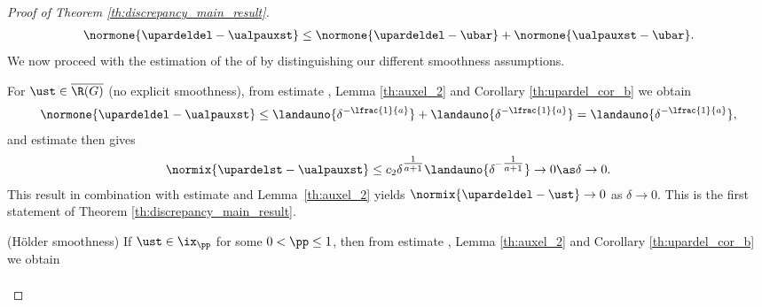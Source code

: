 \documentclass[10pt]{article}
\theoremstyle{definition}
\begin{document}
\begin{proof}[Proof of Theorem \ref{th:discrepancy_main_result}]
%
\begin{align}
\label{eq:upardel_prop-d}
\normone{\upardeldel - \ualpauxst}
\le
\normone{\upardeldel - \ubar} + \normone{\ualpauxst - \ubar}.
\end{align}
We now proceed with the estimation of the \rhs of 
by distinguishing our different smoothness assumptions.
%
\begin{myenumerate}
\item
For $ \ust \in \overline{\R(G)} $ (no explicit smoothness),
from
estimate , Lemma \ref{th:auxel_2} and Corollary \ref{th:upardel_cor_b}
we obtain
%
\begin{align*}
\normone{\upardeldel - \ualpauxst}
\le
\landauno{\delta^{-\lfrac{1}{a}}}
+ \landauno{\delta^{-\lfrac{1}{a}}}
=
\landauno{\delta^{-\lfrac{1}{a}}},
\end{align*}
%
and estimate 
then gives
%
\begin{align*}
\normix{\upardelst -\ualpauxst}
 \le c_2 \delta^{\tfrac{1}{a+1}}
\landauno{\delta^{-\tfrac{1}{a+1}}}
\to 0 \as \delta \to 0.
\end{align*}
%
This result in combination with estimate 
and Lemma~\ref{th:auxel_2}
yields
$
\normix{\upardeldel -\ust} \to 0 $ as $ \delta \to 0 $. This is the first statement of
Theorem \ref{th:discrepancy_main_result}.
%
%
\item (H\"older smoothness)
If $ \ust \in \ix_\pp $ for some $ 0 < \pp \le 1 $, then
from
estimate , Lemma \ref{th:auxel_2} and Corollary \ref{th:upardel_cor_b}
we obtain
%
\begin{align*}

\end{align*}
\end{myenumerate}
\end{proof}
\end{document}
